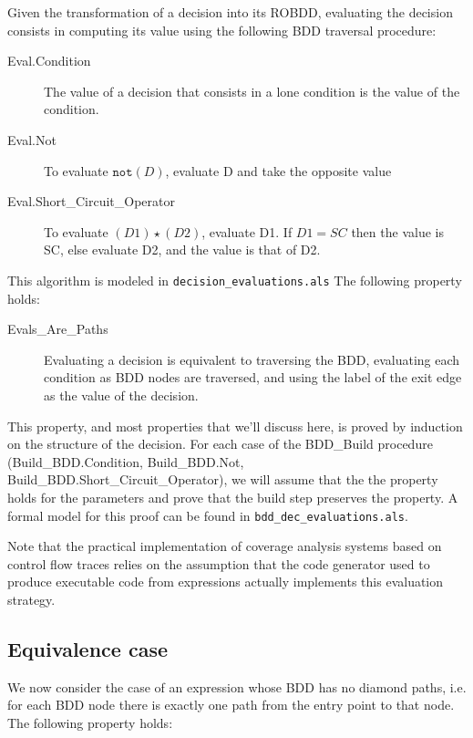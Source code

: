 \documentclass[a4paper,12pt,twoside]{article}
\newcommand{\anysc}{\star}
\newcommand{\adanot}{\texttt{not}}
\newcommand{\alloyspec}[1]{\texttt{#1}}
\begin{document}
Given the transformation of a decision into its ROBDD, evaluating the
decision consists in computing its value using the following BDD traversal
procedure:

\begin{description}
\item[Eval.Condition]
  The value of a decision that consists in a lone condition is the
  value of the condition.

\item[Eval.Not]
  To evaluate $\adanot{} (D)$, evaluate D and take the opposite value

\item[Eval.Short\_Circuit\_Operator]
  To evaluate $(D1) \anysc{} (D2)$, evaluate D1. If $D1 = SC$ then the
  value is SC, else evaluate D2, and the value is that of D2.
\end{description}

This algorithm is modeled in \alloyspec{decision\_evaluations.als}
The following property holds:

\begin{description}
\item[Evals\_Are\_Paths]
  Evaluating a decision is equivalent to traversing the BDD, evaluating
  each condition as BDD nodes are traversed, and using the label of the
  exit edge as the value of the decision.
\end{description}

This property, and most properties that we'll discuss here, is proved
by induction on the structure of the decision.  For each case of the
BDD\_Build procedure (Build\_BDD.Condition, Build\_BDD.Not,
Build\_BDD.Short\_Circuit\_Operator), we will assume that the the
property holds for the parameters and prove that the build step
preserves the property. A formal model for this proof can be found
in \alloyspec{bdd\_dec\_evaluations.als}.

Note that the practical implementation of coverage analysis systems based
on control flow traces relies on the assumption that the code generator
used to produce executable code from expressions actually implements this
evaluation strategy.

\subsection{Equivalence case}

We now consider the case of an expression whose BDD has no diamond paths,
i.e. for each BDD node there is exactly one path from the entry point to
that node. The following property holds:
\end{document}
